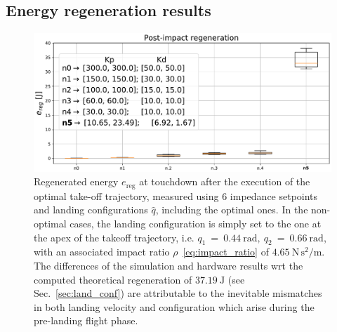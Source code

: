 \subsection{Energy regeneration results}
\begin{figure}[t]
    \centering
    \includegraphics[width=1\columnwidth]{images/opt_vs_non_opt_conf.pdf}
    \caption{Regenerated energy $e_{\mathrm{reg}}$ at touchdown after the execution of the optimal take-off trajectory, measured using 6 impedance setpoints and landing configurations $\hat{q}$, including the optimal ones. In the non-optimal cases, the landing configuration is simply set to the one at the apex of the takeoff trajectory, i.e. $q_1~=~0.44~\mathrm{rad},~q_2~=~0.66~\mathrm{rad}$, with an associated impact ratio $\rho$~\eqref{eq:impact_ratio} of $4.65~\mathrm{N\,s^2/m}$. 
   	The differences of the simulation and hardware results wrt the computed theoretical regeneration of $37.19~\mathrm{J}$ (see Sec.~\ref{sec:land_conf}) are attributable to the inevitable mismatches in both landing velocity and configuration which arise during the pre-landing flight phase.}
    \label{fig:energy_rec_comp}
\end{figure}
